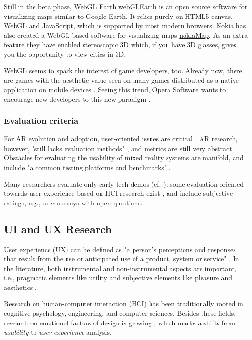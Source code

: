 \documentclass[12pt,journal,compsoc]{IEEEtran}
\begin{document}
Still in the beta phase, WebGL Earth \url{webGLEarth} is an open source software for visualizing maps similar to Google Earth. It relies purely on HTML5 canvas, WebGL and JavaScript, which is supported by most modern browsers.
	Nokia has also created a WebGL based software for visualizing maps \url{nokiaMap}. As an extra feature they have enabled stereoscopic 3D which, if you have 3D glasses, gives you the opportunity to view cities in 3D. 

WebGL seems to spark the interest of game developers, too. Already now, there are games with the aesthetic value seen on many games distributed as a native application on mobile devices \cite{Airscape}. Seeing this trend, Opera Software wants to encourage new developers to this new paradigm \cite{OperaSeminar}.


\subsubsection{Evaluation criteria}
For AR evolution and adoption, user-oriented issues are critical \cite{Olsson2011b}. AR research, however, "still lacks evaluation methods" \cite{Gandy2010}, and metrics are still very abstract \cite{Olsson2011a}. Obstacles for evaluating the usability of mixed reality systems are manifold, and include "a common testing platforms and benchmarks" \cite{Bach2004}.

Many researchers evaluate only early tech demos (cf. \cite{Duenster2008}); some evaluation oriented towards user experience based on HCI research exist \cite{Bach2004}, and include subjective ratings, e.g., user surveys with open questions.

\subsection{UI and UX Research}
User experience (UX) can be defined as "a person's perceptions and responses that result from the use or anticipated use of a product, system or service" \cite{FDIS2009}. In the literature,  both instrumental and non-instrumental aspects are important, i.e., pragmatic elements like utility and subjective elements like pleasure and aesthetics \cite{Hassenzahl2006}. 

Research on human-computer interaction (HCI) has been traditionally rooted in cognitive psychology, engineering, and computer sciences. Besides these fields, research on emotional factors of design is growing \cite{Norman2002}, which marks a shifts from \textit{usability} to \textit{user experience} analysis.
\end{document}
